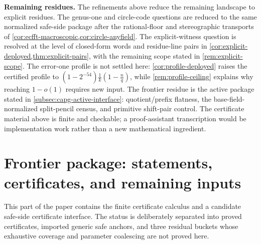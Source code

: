 \documentclass[11pt]{article}
\theoremstyle{definition}
\theoremstyle{remark}
\begin{document}
\medskip
\noindent\textbf{Remaining residues.}
The refinements above reduce the remaining landscape to explicit residues.  The genus-one and circle-code questions are reduced to the same normalized safe-side package after the rational-floor and stereographic transports of \cref{cor:ecfft-macroscopic,cor:circle-anyfield}.  The explicit-witness question is resolved at the level of closed-form words and residue-line pairs in \cref{cor:explicit-deployed,thm:explicit-pairs}, with the remaining scope stated in \cref{rem:explicit-scope}.  The error-one profile is not settled here: \cref{cor:profile-deployed} raises the certified profile to $(1-2^{-54})\frac1k(1-\frac nq)$, while \cref{rem:profile-ceiling} explains why reaching $1-o(1)$ requires new input.  The frontier residue is the active package stated in \cref{subsec:capg-active-interface}: quotient/prefix flatness, the base-field-normalized split-pencil census, and primitive shift-pair control.  The certificate material above is finite and checkable; a proof-assistant transcription would be implementation work rather than a new mathematical ingredient.


\section{Frontier package: statements, certificates, and remaining inputs}\label{sec:frontier-package}

This part of the paper contains the finite certificate calculus and a candidate safe-side certificate interface.  The status is deliberately separated into proved certificates, imported generic safe anchors, and three residual buckets whose exhaustive coverage and parameter coalescing are not proved here.
\end{document}
